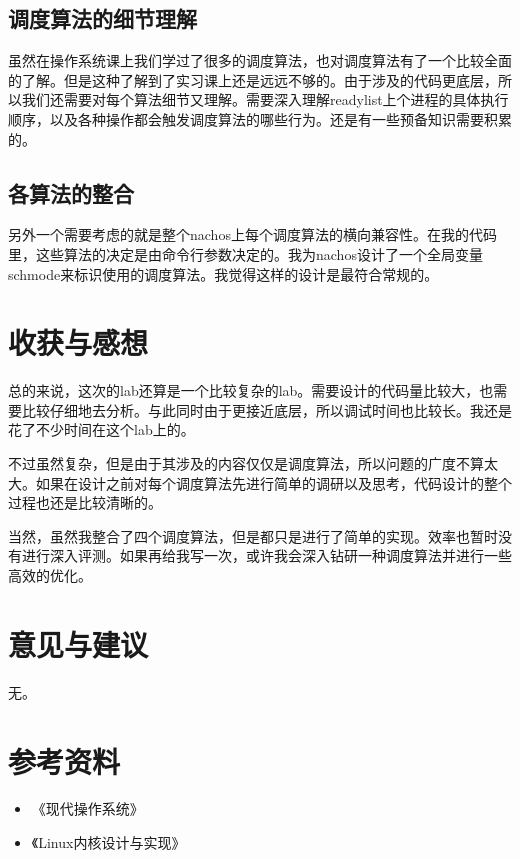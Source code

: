\documentclass[nofonts]{ctexart}
\begin{document}
\subsection*{调度算法的细节理解}
虽然在操作系统课上我们学过了很多的调度算法，也对调度算法有了一个比较全面的了解。但是这种了解到了实习课上还是远远不够的。由于涉及的代码更底层，所以我们还需要对每个算法细节又理解。需要深入理解readylist上个进程的具体执行顺序，以及各种操作都会触发调度算法的哪些行为。还是有一些预备知识需要积累的。
\subsection*{各算法的整合}
另外一个需要考虑的就是整个nachos上每个调度算法的横向兼容性。在我的代码里，这些算法的决定是由命令行参数决定的。我为nachos设计了一个全局变量schmode来标识使用的调度算法。我觉得这样的设计是最符合常规的。

\section{收获与感想}
总的来说，这次的lab还算是一个比较复杂的lab。需要设计的代码量比较大，也需要比较仔细地去分析。与此同时由于更接近底层，所以调试时间也比较长。我还是花了不少时间在这个lab上的。

不过虽然复杂，但是由于其涉及的内容仅仅是调度算法，所以问题的广度不算太大。如果在设计之前对每个调度算法先进行简单的调研以及思考，代码设计的整个过程也还是比较清晰的。

当然，虽然我整合了四个调度算法，但是都只是进行了简单的实现。效率也暂时没有进行深入评测。如果再给我写一次，或许我会深入钻研一种调度算法并进行一些高效的优化。

\section{意见与建议}
无。

\section{参考资料}
\begin{itemize}
\item 《现代操作系统》
\item 《Linux内核设计与实现》
\end{itemize}
\end{document}
